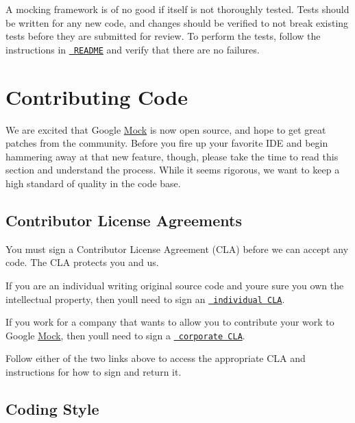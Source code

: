 A mocking framework is of no good if itself is not thoroughly tested. Tests should be written for any new code, and changes should be verified to not break existing tests before they are submitted for review. To perform the tests, follow the instructions in \href{http://code.google.com/p/googlemock/source/browse/trunk/README}\texttt{ R\+E\+A\+D\+ME} and verify that there are no failures.

\section*{Contributing Code}

We are excited that Google \mbox{\hyperlink{class_mock}{Mock}} is now open source, and hope to get great patches from the community. Before you fire up your favorite I\+DE and begin hammering away at that new feature, though, please take the time to read this section and understand the process. While it seems rigorous, we want to keep a high standard of quality in the code base.

\subsection*{Contributor License Agreements}

You must sign a Contributor License Agreement (C\+LA) before we can accept any code. The C\+LA protects you and us.


\begin{DoxyItemize}
\item If you are an individual writing original source code and you\textquotesingle{}re sure you own the intellectual property, then you\textquotesingle{}ll need to sign an \href{http://code.google.com/legal/individual-cla-v1.0.html}\texttt{ individual C\+LA}.
\item If you work for a company that wants to allow you to contribute your work to Google \mbox{\hyperlink{class_mock}{Mock}}, then you\textquotesingle{}ll need to sign a \href{http://code.google.com/legal/corporate-cla-v1.0.html}\texttt{ corporate C\+LA}.
\end{DoxyItemize}

Follow either of the two links above to access the appropriate C\+LA and instructions for how to sign and return it.

\subsection*{Coding Style}

